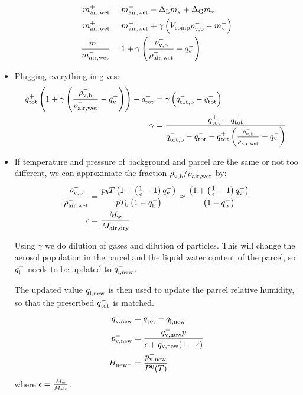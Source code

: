 \documentclass{article}
\begin{document}
\begin{itemize}
\begin{align}
m_{\rm air, wet}^+ &= m_{\rm air, wet}^- - \Delta_{\rm L} m_{\rm v} + \Delta_{\rm G} m_{\rm v} \\
m_{\rm air, wet}^+ &= m_{\rm air, wet}^- + \gamma \left( V_{\rm comp}\rho_{\rm v,b}^- - m_{\rm v}^- \right)\\
\frac{m^+}{m_{\rm air, wet}^-} & = 1 + \gamma \left(\frac{\rho_{\rm v,b}^-}{\rho_{\rm air, wet}^-} - q_{\rm v}^- \right)
\end{align}
\item Plugging everything in gives:
\begin{align}
q_{\rm tot}^+ \left(1+\gamma \left(\frac{\rho_{\rm v,b}^-}{\rho_{\rm air, wet}^-} - q_{\rm v}^- \right)\right) - q_{\rm tot}^- & = \gamma \left(q_{\rm tot, b}^- - q_{\rm tot}^- \right) \\
\gamma & = \frac{q_{\rm tot}^+ - q_{\rm tot}^-}{q_{\rm tot, b}^- - q_{\rm tot}^- - q_{\rm tot}^+ \left(\frac{\rho_{\rm v,b}^-}{\rho_{\rm air, wet}^-} - q_{\rm v}^- \right)}
\end{align}
\item If temperature and pressure of background and parcel are the same or not too different, we can approximate the fraction $\rho_{\rm v,b}^-/\rho_{\rm air, wet}^-$ by:
\begin{align}
\frac{\rho_{\rm v,b}^-}{\rho_{\rm air, wet}^-} & = \frac{p_b T \left(1 + \left(\frac{1}{\epsilon} - 1 \right) q_{\rm v}^-\right)}{p T_{\rm b} \left(1 - q_{\rm b}^-\right)} \approx  \frac{\left(1 + \left(\frac{1}{\epsilon} - 1 \right) q_{\rm v}^-\right)}{\left(1 - q_{\rm b}^-\right)} \\
\epsilon & = \frac{M_{\rm w}}{M_{\rm air, dry}}
\end{align}

Using $\gamma$ we do dilution of gases and dilution of particles. This
will change the aerosol population in the parcel and the liquid water
content of the parcel, so $q_{\rm l}^-$ needs to be updated to
$q_{\rm l, new}^-$.

The updated value $q_{\rm l, new}^-$ is then used to update the
parcel relative humidity, so that the prescribed $q_{\rm tot}^-$ is
matched.
\begin{align}
q_{\rm v, new}^- &= q_{\rm tot}^- - q_{\rm l, new}^- \\
p_{\rm v, new}^- &= \frac{q_{\rm v, new}^- p}
        {\epsilon + q_{\rm v, new}^- (1 - \epsilon)} \\
H_{{\rm new}^-} &= \frac{p_{\rm v, new}^-}{P^0(T)}
\end{align}
where $\epsilon = \frac{M_{\rm w}}{M_{\rm air}}$.

\end{itemize}
\end{document}
